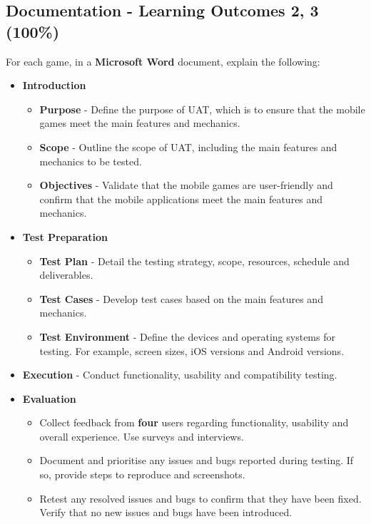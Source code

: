 \documentclass{article}
\begin{document}
\subsection*{Documentation - Learning Outcomes 2, 3 (100\%)}
For each game, in a \textbf{Microsoft Word} document, explain the following:
\begin{itemize}
    \item \textbf{Introduction} 
    \begin{itemize}
        \item \textbf{Purpose} - Define the purpose of UAT, which is to ensure that the mobile games meet the main features and mechanics.
        \item \textbf{Scope} - Outline the scope of UAT, including the main features and mechanics to be tested.
        \item \textbf{Objectives} - Validate that the mobile games are user-friendly and confirm that the mobile applications meet the main features and mechanics.
    \end{itemize}

    \item \textbf{Test Preparation}
    \begin{itemize}
        \item \textbf{Test Plan} - Detail the testing strategy, scope, resources, schedule and deliverables.
        \item \textbf{Test Cases} - Develop test cases based on the main features and mechanics.
        \item \textbf{Test Environment} - Define the devices and operating systems for testing. For example, screen sizes, iOS versions and Android versions.
    \end{itemize}
    
    \item \textbf{Execution} - Conduct functionality, usability and compatibility testing.

    \item \textbf{Evaluation}
    \begin{itemize}
        \item Collect feedback from \textbf{four} users regarding functionality, usability and overall experience. Use surveys and interviews.
        \item Document and prioritise any issues and bugs reported during testing. If so, provide steps to reproduce and screenshots.
        \item Retest any resolved issues and bugs to confirm that they have been fixed. Verify that no new issues and bugs have been introduced.
    \end{itemize}


\end{itemize}
\end{document}
